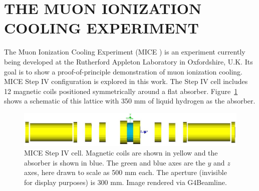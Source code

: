 \documentclass{jacow}
\begin{document}
%


\section{THE MUON IONIZATION COOLING EXPERIMENT}
The Muon Ionization Cooling Experiment (MICE \cite{mice}) is an experiment currently being developed at the Rutherford Appleton Laboratory in Oxfordshire, U.K. Its goal is to show a proof-of-principle demonstration of muon ionization cooling. MICE Step IV configuration is explored in this work. The Step IV cell includes 12 magnetic coils positioned symmetrically around a flat absorber. Figure~\ref{fig:miceStepIV} shows a schematic of this lattice with 350 mm of liquid hydrogen as the absorber.
\begin{figure}[htb]
  \centering
    \includegraphics[width=\columnwidth]{miceStepIV} 
  \caption[MICE Step IV cell.]{MICE Step IV cell. Magnetic coils are shown in yellow and the absorber is shown in blue. The green and blue axes are the $y$ and $z$ axes, here drawn to scale as 500 mm each. The aperture (invisible for display purposes) is 300 mm. Image rendered via G4Beamline.}
  \label{fig:miceStepIV}
\end{figure}
\end{document}
